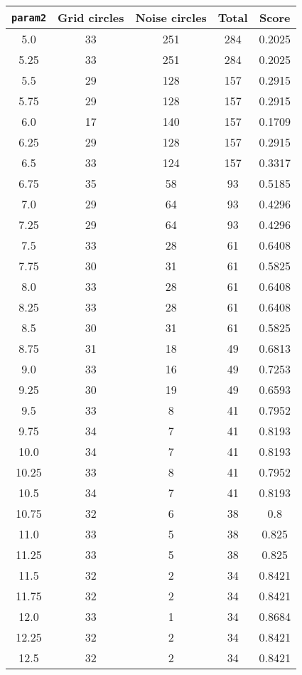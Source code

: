 \documentclass[letterpaper, 12pt]{article}
\begin{document}
\begin{longtable}{|c|c|c|c|c|}
\hline
\textbf{\texttt{param2}} & \textbf{Grid circles} & \textbf{Noise circles} & \textbf{Total} & \textbf{Score} \\
\hline
5.0 & 33 & 251 & 284 & 0.2025 \\
\hline
5.25 & 33 & 251 & 284 & 0.2025 \\
\hline
5.5 & 29 & 128 & 157 & 0.2915 \\
\hline
5.75 & 29 & 128 & 157 & 0.2915 \\
\hline
6.0 & 17 & 140 & 157 & 0.1709 \\
\hline
6.25 & 29 & 128 & 157 & 0.2915 \\
\hline
6.5 & 33 & 124 & 157 & 0.3317 \\
\hline
6.75 & 35 & 58 & 93 & 0.5185 \\
\hline
7.0 & 29 & 64 & 93 & 0.4296 \\
\hline
7.25 & 29 & 64 & 93 & 0.4296 \\
\hline
7.5 & 33 & 28 & 61 & 0.6408 \\
\hline
7.75 & 30 & 31 & 61 & 0.5825 \\
\hline
8.0 & 33 & 28 & 61 & 0.6408 \\
\hline
8.25 & 33 & 28 & 61 & 0.6408 \\
\hline
8.5 & 30 & 31 & 61 & 0.5825 \\
\hline
8.75 & 31 & 18 & 49 & 0.6813 \\
\hline
9.0 & 33 & 16 & 49 & 0.7253 \\
\hline
9.25 & 30 & 19 & 49 & 0.6593 \\
\hline
9.5 & 33 & 8 & 41 & 0.7952 \\
\hline
9.75 & 34 & 7 & 41 & 0.8193 \\
\hline
10.0 & 34 & 7 & 41 & 0.8193 \\
\hline
10.25 & 33 & 8 & 41 & 0.7952 \\
\hline
10.5 & 34 & 7 & 41 & 0.8193 \\
\hline
10.75 & 32 & 6 & 38 & 0.8 \\
\hline
11.0 & 33 & 5 & 38 & 0.825 \\
\hline
11.25 & 33 & 5 & 38 & 0.825 \\
\hline
11.5 & 32 & 2 & 34 & 0.8421 \\
\hline
11.75 & 32 & 2 & 34 & 0.8421 \\
\hline
12.0 & 33 & 1 & 34 & 0.8684 \\
\hline
12.25 & 32 & 2 & 34 & 0.8421 \\
\hline
12.5 & 32 & 2 & 34 & 0.8421 \\

\end{longtable}
\end{document}
